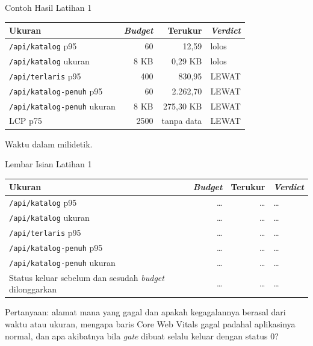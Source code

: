 \documentclass[aspectratio=169, table, 12pt]{beamer}
\begin{document}
\begin{frame}{{\Large Contoh Hasil Latihan 1}}
  \vspace{4pt}
  \centering
  {\footnotesize
  \begin{tabularx}{\textwidth}{Yrrl}
    \hline
    \textbf{Ukuran} & \textbf{\textit{Budget}} & \textbf{Terukur} & \textbf{\textit{Verdict}} \\
    \hline
    \texttt{/api/katalog} p95 & 60 & 12,59 & lolos \\
    \hline
    \texttt{/api/katalog} ukuran & 8 KB & 0,29 KB & lolos \\
    \hline
    \texttt{/api/terlaris} p95 & 400 & 830,95 & LEWAT \\
    \hline
    \texttt{/api/katalog-penuh} p95 & 60 & 2.262,70 & LEWAT \\
    \hline
    \texttt{/api/katalog-penuh} ukuran & 8 KB & 275,30 KB & LEWAT \\
    \hline
    LCP p75 & 2500 & tanpa data & LEWAT \\
    \hline
  \end{tabularx}}

  \vspace{6pt}
  {\footnotesize Waktu dalam milidetik.}
\end{frame}

\begin{frame}{{\Large Lembar Isian Latihan 1}}
  \vspace{4pt}
  \centering
  {\footnotesize
  \begin{tabularx}{\textwidth}{Yrrl}
    \hline
    \textbf{Ukuran} & \textbf{\textit{Budget}} & \textbf{Terukur} & \textbf{\textit{Verdict}} \\
    \hline
    \texttt{/api/katalog} p95 & \dots & \dots & \dots \\
    \hline
    \texttt{/api/katalog} ukuran & \dots & \dots & \dots \\
    \hline
    \texttt{/api/terlaris} p95 & \dots & \dots & \dots \\
    \hline
    \texttt{/api/katalog-penuh} p95 & \dots & \dots & \dots \\
    \hline
    \texttt{/api/katalog-penuh} ukuran & \dots & \dots & \dots \\
    \hline
    Status keluar sebelum dan sesudah \textit{budget} dilonggarkan & \dots & \dots & \dots \\
    \hline
  \end{tabularx}}

  \vspace{6pt}
  {\footnotesize Pertanyaan: alamat mana yang gagal dan apakah kegagalannya
  berasal dari waktu atau ukuran, mengapa baris Core Web Vitals gagal padahal
  aplikasinya normal, dan apa akibatnya bila \textit{gate} dibuat selalu keluar
  dengan status 0?}
\end{frame}
\end{document}
